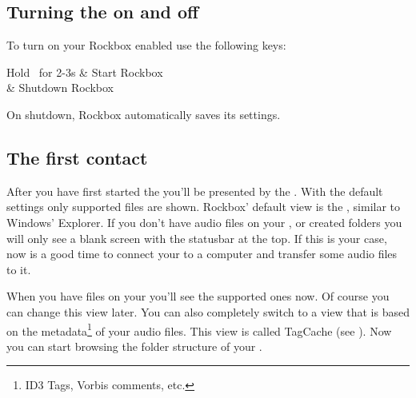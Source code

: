 \subsection{Turning the \dap{} on and off}
To turn on your Rockbox enabled \dap{} use the following keys:
\begin{table}
    \begin{btnmap}{}{}
        {Hold \ButtonOn\ for 2{}-3s}
      & Start Rockbox\\
      & Shutdown Rockbox\\
    \end{btnmap}
\end{table}

\label{ref:Safeshutdown}On shutdown, Rockbox automatically saves its settings.
\subsection{The first contact}

After you have  first started the \dap{} you'll be presented by the
. With the default settings only supported files are
shown. Rockbox' default view is the , similar to Windows'
Explorer. If you don't have audio files on your \dap{}, or created folders you
will only see a blank screen with the statusbar at the top. If this is your
case, now is a good time to connect your \dap{} to a computer and transfer some
audio files to it.

When you have files on your \dap{} you'll see the supported ones now. Of
course you can change this view later. You can also completely switch to
a view that is based on the metadata\footnote{ID3 Tags, Vorbis comments, etc.}
of your audio files. This view is called TagCache (see
). Now you can start browsing the folder structure of
your \dap{}.

